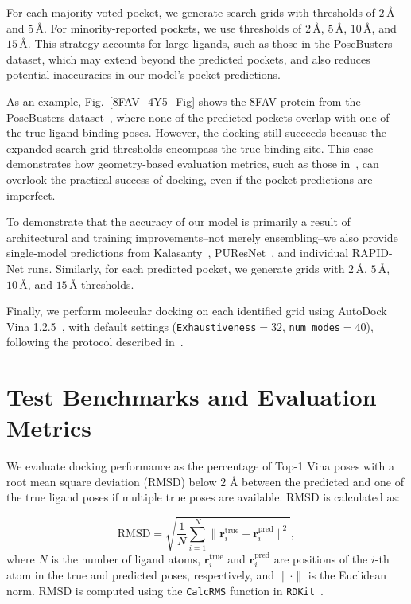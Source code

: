 \documentclass[10pt,conference]{IEEEtran}
\begin{document}
For each majority-voted pocket, we generate search grids with thresholds of $2\,\text{\AA}$ and $5\,\text{\AA}$. For minority-reported pockets, we use thresholds of $2\,\text{\AA}$, $5\,\text{\AA}$, $10\,\text{\AA}$, and $15\,\text{\AA}$. This strategy accounts for large ligands, such as those in the PoseBusters~\cite{Buttenschoen2024} dataset, which may extend beyond the predicted pockets, and also reduces potential inaccuracies in our model's pocket predictions. 


As an example, Fig.~\ref{8FAV_4Y5_Fig} shows the 8FAV protein from the PoseBusters dataset~\cite{Buttenschoen2024}, where none of the predicted pockets overlap with one of the true ligand binding poses. However, the docking still succeeds because the expanded search grid thresholds encompass the true binding site. This case demonstrates how geometry-based evaluation metrics, such as those in~\cite{utges2024comparative}, can overlook the practical success of docking, even if the pocket predictions are imperfect.


To demonstrate that the accuracy of our model is primarily a result of architectural and training improvements--not merely ensembling--we also provide single-model predictions from Kalasanty~\cite{stepniewska2020improving}, PUResNet~\cite{kandel2021puresnet}, and individual RAPID-Net runs. Similarly, for each predicted pocket, we generate grids with $2\,\text{\AA}$, $5\,\text{\AA}$, $10\,\text{\AA}$, and $15\,\text{\AA}$ thresholds. 


Finally, we perform molecular docking on each identified grid using AutoDock Vina 1.2.5~\cite{eberhardt2021autodock}, with default settings (\texttt{Exhaustiveness}$ = 32$, \texttt{num\_modes}$ = 40$), following the protocol described in~\cite{Buttenschoen2024}.








\section{Test Benchmarks and Evaluation Metrics}
\label{Benchmark_Evaluation}

We evaluate docking performance as the percentage of Top-1 Vina poses with a root mean square deviation (RMSD) below $2$ $\text{\AA}$ between the predicted and one of the true ligand poses if multiple true poses are available. RMSD is calculated as:

\begin{equation}
\text{RMSD} = \sqrt{\frac{1}{N} \sum_{i=1}^{N} \lVert \mathbf{r}_i^{\text{true}} - \mathbf{r}_i^{\text{pred}} \rVert^2},
\end{equation}
where $N$ is the number of ligand atoms, $\mathbf{r}_i^{\text{true}}$ and $\mathbf{r}_i^{\text{pred}}$ are positions of the $i$-th atom in the true and predicted poses, respectively, and $\lVert \cdot \rVert$ is the Euclidean norm. RMSD is computed using the \texttt{CalcRMS} function in \texttt{RDKit}~\cite{landrum2013rdkit}.
\end{document}
